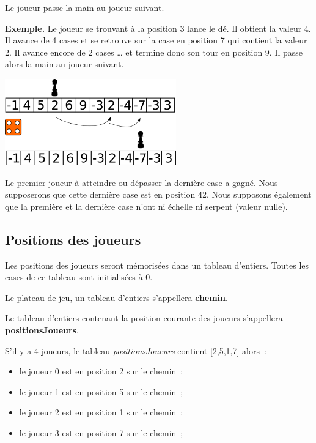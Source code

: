 			Le joueur passe la main au joueur suivant. 
			
			\textbf{Exemple.} Le joueur se trouvant à la position 3 lance le dé. Il
			obtient la valeur 4. Il avance de 4 cases et se retrouve sur la case en
			position 7 qui contient la valeur 2. Il avance encore de 2 cases … et
			termine donc son tour en position 9. Il passe alors la main au joueur suivant.
		
			\begin{center}
				\includegraphics[width=280px]{image/snake-1}
			\end{center}
			
			Le premier joueur à atteindre ou dépasser la dernière case a gagné. Nous supposerons que
			cette dernière case est en position 42. Nous supposons également que la première et la dernière case n'ont ni échelle ni serpent (valeur nulle).
	
		\subsection*{Positions des joueurs}
		
			Les positions des joueurs seront mémorisées dans un tableau d'entiers. 
			Toutes les cases de ce tableau sont initialisées à 0. 
		
			Le plateau de jeu, un tableau d'entiers s'appellera \textbf{chemin}. 
		
			Le tableau d'entiers contenant la position courante des joueurs s'appellera
			\textbf{positionsJoueurs}. 
		
			S'il y a 4 joueurs, le tableau \textit{positionsJoueurs} contient 
			[2,5,1,7] alors~:
			\begin{itemize}
				\item le joueur 0 est en position 2 sur le chemin~;
				\item le joueur 1 est en position 5 sur le chemin~;
				\item le joueur 2 est en position 1 sur le chemin~;
				\item le joueur 3 est en position 7 sur le chemin~;
			\end{itemize}
				
